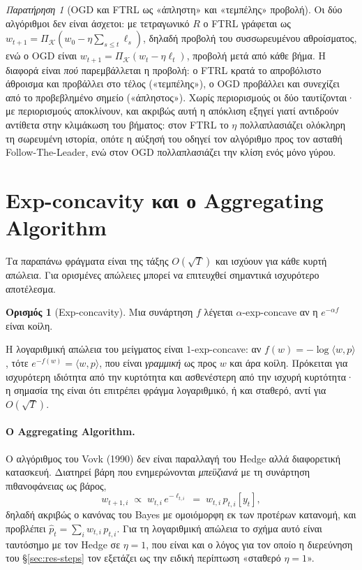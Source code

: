\documentclass[12pt,a4paper,oneside]{report}
\newcommand{\en}[1]{\textenglish{#1}}
\renewcommand{\_}{\oldunderscore\allowbreak}
\theoremstyle{definition}
\newtheorem{definition}{Ορισμός}[chapter]
\theoremstyle{plain}
\theoremstyle{remark}
\newtheorem{remark}[theorem]{Παρατήρηση}
\begin{document}
\begin{remark}[OGD και FTRL ως «άπληστη» και «τεμπέλης» προβολή]
Οι δύο αλγόριθμοι δεν είναι άσχετοι: με τετραγωνικό $R$ ο FTRL γράφεται ως
$w_{t+1} = \Pi_{\mathcal{K}}(w_0 - \eta\sum_{s\leq t}\ell_s)$, δηλαδή προβολή του
συσσωρευμένου αθροίσματος, ενώ ο OGD είναι $w_{t+1} = \Pi_{\mathcal{K}}(w_t - \eta\ell_t)$,
προβολή μετά από κάθε βήμα. Η διαφορά είναι \emph{πού} παρεμβάλλεται η προβολή: ο FTRL
κρατά το απροβόλιστο άθροισμα και προβάλλει στο τέλος («τεμπέλης»), ο OGD προβάλλει και
συνεχίζει από το προβεβλημένο σημείο («άπληστος»). Χωρίς περιορισμούς οι δύο ταυτίζονται·
με περιορισμούς αποκλίνουν, και ακριβώς αυτή η απόκλιση εξηγεί γιατί αντιδρούν αντίθετα
στην κλιμάκωση του βήματος: στον FTRL το $\eta$ πολλαπλασιάζει ολόκληρη τη σωρευμένη
ιστορία, οπότε η αύξησή του οδηγεί τον αλγόριθμο προς τον ασταθή \en{Follow-The-Leader},
ενώ στον OGD πολλαπλασιάζει την κλίση ενός μόνο γύρου.
\end{remark}

\section{Exp-concavity και ο Aggregating Algorithm}
\label{sec:expconcave}

Τα παραπάνω φράγματα είναι της τάξης $O(\sqrt{T})$ και ισχύουν για κάθε κυρτή απώλεια. Για
ορισμένες απώλειες μπορεί να επιτευχθεί σημαντικά ισχυρότερο αποτέλεσμα.

\begin{definition}[Exp-concavity]
Μια συνάρτηση $f$ λέγεται $\alpha$-exp-concave αν η $e^{-\alpha f}$ είναι κοίλη.
\end{definition}

Η λογαριθμική απώλεια του μείγματος είναι $1$-exp-concave: αν
$f(w) = -\log \langle w, p\rangle$, τότε $e^{-f(w)} = \langle w, p\rangle$, που είναι
\emph{γραμμική} ως προς $w$ και άρα κοίλη. Πρόκειται για ισχυρότερη ιδιότητα από την
κυρτότητα και ασθενέστερη από την ισχυρή κυρτότητα· η σημασία της είναι ότι επιτρέπει
φράγμα λογαριθμικό, ή και σταθερό, αντί για $O(\sqrt{T})$.

\paragraph{Ο Aggregating Algorithm.} Ο αλγόριθμος του Vovk (1990) δεν είναι παραλλαγή του
Hedge αλλά διαφορετική κατασκευή. Διατηρεί βάρη που ενημερώνονται \emph{μπεϋζιανά} με τη
συνάρτηση πιθανοφάνειας ως βάρος,
\[
w_{t+1,i} \;\propto\; w_{t,i}\, e^{-\ell_{t,i}} \;=\; w_{t,i}\, p_{t,i}[y_t],
\]
δηλαδή ακριβώς ο κανόνας του Bayes με ομοιόμορφη εκ των προτέρων κατανομή, και προβλέπει
$\hat{p}_t = \sum_i w_{t,i}\,p_{t,i}$. Για τη λογαριθμική απώλεια το σχήμα αυτό είναι
ταυτόσημο με τον Hedge σε $\eta=1$, που είναι και ο λόγος για τον οποίο η διερεύνηση του
\S\ref{sec:res-steps} τον εξετάζει ως την ειδική περίπτωση «σταθερό $\eta=1$».
\end{document}
